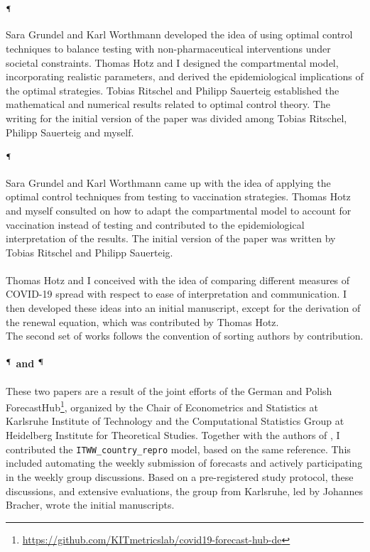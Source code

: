 \begin{refsection}
\paragraph{\cite{Grundel2022How}$^{\mathparagraph}$}
Sara Grundel and Karl Worthmann developed the idea of using optimal control techniques to balance testing with non-pharmaceutical interventions under societal constraints.
Thomas Hotz and I designed the compartmental model, incorporating realistic parameters, and derived the epidemiological implications of the optimal strategies. 
Tobias Ritschel and Philipp Sauerteig established the mathematical and numerical results related to optimal control theory.
The writing for the initial version of the paper was divided among Tobias Ritschel, Philipp Sauerteig and myself. 

\paragraph{\cite{Grundel2021How}$^{\mathparagraph}$}
Sara Grundel and Karl Worthmann came up with the idea of applying the optimal control techniques from testing to vaccination strategies. Thomas Hotz and myself consulted on how to adapt the compartmental model to account for vaccination instead of testing and contributed to the epidemiological interpretation of the results. The initial version of the paper was written by Tobias Ritschel and Philipp Sauerteig.

\paragraph{\cite{Heyder2023Measures}}
Thomas Hotz and I conceived with the idea of comparing different measures of COVID-19 spread with respect to ease of interpretation and communication. I then developed these ideas into an initial manuscript, except for the derivation of the renewal equation, which was contributed by Thomas Hotz. \\[18pt]

The second set of works follows the convention of sorting authors by contribution.

\paragraph{\cite{Bracher2021Preregistered}$^\mathparagraph$ and \cite{Bracher2022National}$^\mathparagraph$}
These two papers are a result of the joint efforts of the German and Polish ForecastHub\footnote{\url{https://github.com/KITmetricslab/covid19-forecast-hub-de}}, organized by the Chair of Econometrics and Statistics at Karlsruhe Institute of Technology and the Computational Statistics Group at Heidelberg Institute for Theoretical Studies. Together with the authors of \citep{Burgard2021Regional}, I contributed the \texttt{ITWW\_country\_repro} model, based on the same reference. This included automating the weekly submission of forecasts and actively participating in the weekly group discussions. Based on a pre-registered study protocol, these discussions, and extensive evaluations, the group from Karlsruhe, led by Johannes Bracher, wrote the initial manuscripts.


\end{refsection}
